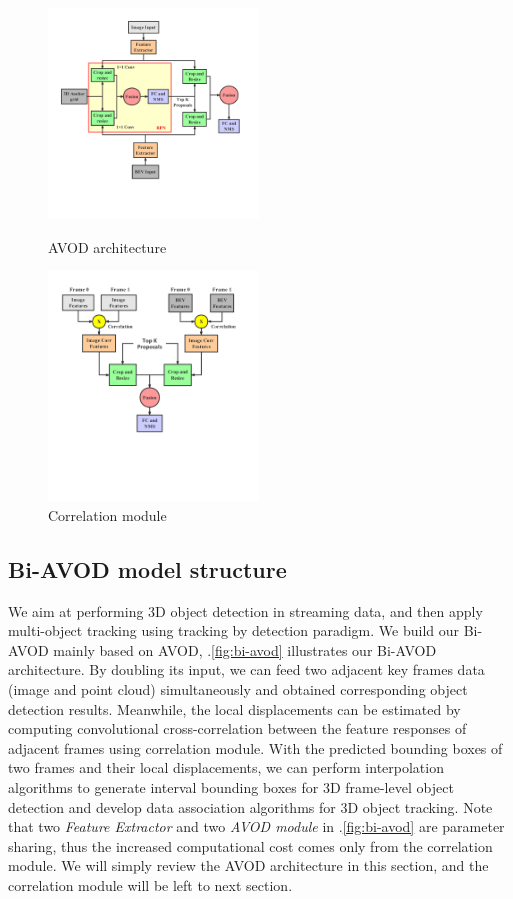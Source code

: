 \documentclass{bmvc2k}
\begin{document}
\begin{figure}
	\setlength{\abovecaptionskip}{-0.5cm}
	\begin{minipage}[t]{0.5\linewidth}
		\centering
		\includegraphics[trim={0cm, 4cm, 2cm, 0cm}, clip, width=2.2in]{images/AVOD.pdf}
		\caption{AVOD architecture}
		\label{fig:avod}
	\end{minipage}%
	\begin{minipage}[t]{0.5\linewidth}
		\centering
		\includegraphics[trim={0cm, 6cm, 2cm, 0cm}, clip, width=2.2in]{images/Correlation.pdf}
		\caption{Correlation module}
		\label{fig:correlation}
	\end{minipage}
\end{figure}

\subsection{Bi-AVOD model structure}
We aim at performing 3D object detection in streaming data, and then apply multi-object tracking using tracking by detection paradigm. We build our Bi-AVOD mainly based on AVOD\cite{ku2018joint}, \figurename .\ref{fig:bi-avod} illustrates our Bi-AVOD architecture. By doubling its input, we can feed two adjacent key frames data (image and point cloud) simultaneously and obtained corresponding object detection results. Meanwhile, the local displacements can be estimated by computing convolutional cross-correlation between the feature responses of adjacent frames using correlation module. With the predicted bounding boxes of two frames and their local displacements, we can perform interpolation algorithms to generate interval bounding boxes for 3D frame-level object detection and develop data association algorithms for 3D object tracking. Note that two \textit{Feature Extractor} and two \textit{AVOD module} in \figurename .\ref{fig:bi-avod} are parameter sharing, thus the increased computational cost comes only from the correlation module. We will simply review the AVOD architecture in this section, and the correlation module will be left to next section.
\end{document}
